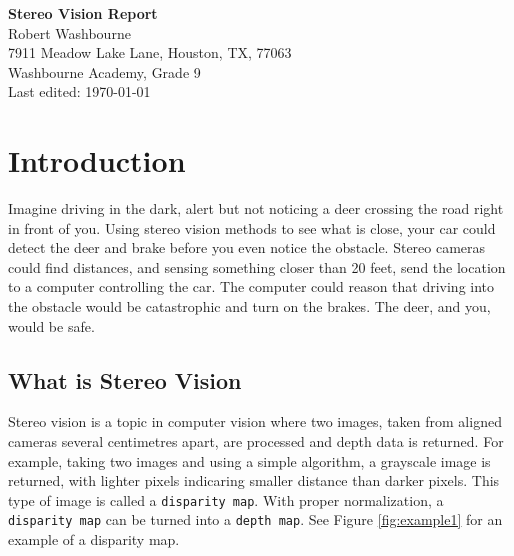 \documentclass[11pt,fleqn]{article}
\begin{document}
\begin{center}
\huge{\textbf{Stereo Vision Report}}\\[20pt]
\Large{Robert Washbourne}\\[20pt]
7911 Meadow Lake Lane, Houston, TX, 77063\\[20pt]
Washbourne Academy, Grade 9\\[20pt]
Last edited: \today
\end{center}

\newpage
\tableofcontents
\vspace{10pt}
\listoffigures
\newpage
\normalsize

\section{Introduction}

Imagine driving in the dark, alert but not noticing a deer crossing the road right in front of you. Using stereo vision methods to see what is close, your car could detect the deer and brake before you even notice the obstacle. Stereo cameras could find distances, and sensing something closer than 20 feet, send the location to a computer controlling the car. The computer could reason that driving into the obstacle would be catastrophic and turn on the brakes. The deer, and you, would be safe.

\subsection{What is Stereo Vision}

Stereo vision is a topic in computer vision where two images, taken from aligned cameras several centimetres apart, are processed and depth data is returned. For example, taking two images and using a simple algorithm, a grayscale image is returned, with lighter pixels indicaring smaller distance than darker pixels. This type of image is called a \texttt{disparity map}. With proper normalization, a \texttt{disparity map} can be turned into a \texttt{depth map}. See Figure \ref{fig:example1} for an example of a disparity map.\\[5pt]
\end{document}
